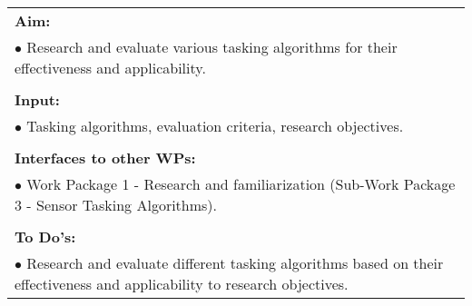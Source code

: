 \begin{table}[!h]
\begin{center}
\begin{tabular}{|p{35mm}||p{55mm}|p{50mm}||p{40mm}|}
      \hline\hline
      \multicolumn{4}{|p{150mm}|}{\textbf{Aim:}}                                                                                                                                                            \\
      \multicolumn{4}{|p{150mm}|}{$\bullet$ Research and evaluate various tasking algorithms for their effectiveness and applicability.}                                                   \\
      \multicolumn{4}{|p{150mm}|}{}                                                                                                                                                                           \\
      \multicolumn{4}{|p{150mm}|}{\textbf{Input:}}                                                                                                                                                            \\
      \multicolumn{4}{|p{150mm}|}{$\bullet$  Tasking algorithms, evaluation criteria, research objectives.}                                                                                                                                 \\
      \multicolumn{4}{|p{150mm}|}{}                                                                                                                                                                           \\
      \multicolumn{4}{|p{150mm}|}{\textbf{Interfaces to other WPs:}}                                                                                                                                    \\
      \multicolumn{4}{|p{150mm}|}{$\bullet$ Work Package 1 - Research and familiarization (Sub-Work Package 3 - Sensor Tasking Algorithms).}                                                                                              \\
      \multicolumn{4}{|p{150mm}|}{}                                                                                                                                                                           \\
      \multicolumn{4}{|p{150mm}|}{\textbf{To Do's:}}                                                                                                                                                         \\
      \multicolumn{4}{|p{150mm}|}{$\bullet$ Research and evaluate different tasking algorithms based on their effectiveness and applicability to research objectives.}\\

\end{tabular}
\end{center}
\end{table}
